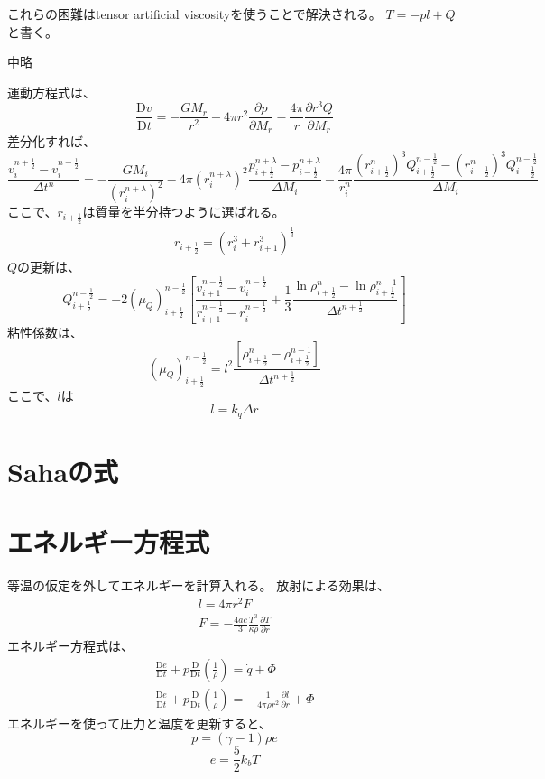\documentclass{jsarticle}
\newcommand{\pder}[2][]{\frac{\partial#1}{\partial#2}}
\newcommand{\Dder}[2][]{\frac{\mathrm{D}#1}{\mathrm{D}#2}}
\newcommand{\half}{\frac{1}{2}}
\newcommand{\hpn}{n + \half}
\newcommand{\hmn}{n - \half}
\newcommand{\hpi}{i + \half}
\newcommand{\beq}{\begin{equation}}
\newcommand{\eeq}{\end{equation}}
\begin{document}
これらの困難はtensor artificial viscosityを使うことで解決される。
$T = - pl + Q$と書く。　

中略

運動方程式は、
\beq
    \Dder[v]{t} = - \frac{GM_r}{r^2} - 4\pi r^2\pder[p]{M_r} - \frac{4\pi}{r}\pder[r^3Q]{M_r}
\eeq
差分化すれば、
\beq
    \frac{v^{n+\half}_i - v^{n-\half}_i}{\Delta t^n} =
    -\frac{GM_i}{(r^{n+\lambda}_i)^2}
    -4\pi(r^{n+\lambda}_i)^2
    \frac{p^{n+\lambda}_{i+\half} - p^{n+\lambda}_{i-\half}}{\Delta M_i}
    -\frac{4\pi}{r^{n}_i}
    \frac{(r^{n}_{i+\half})^3Q^{n-\half}_{i+\half} - (r^{n}_{i-\half})^3Q^{n-\half}_{i-\half}}{\Delta M_i}
\eeq
ここで、$r_{i+\half}$は質量を半分持つように選ばれる。
\begin{align}
    r_{i+\half} = (r^3_i + r^3_{i+1})^{\frac{1}{3}}
\end{align}
$Q$の更新は、
\beq
    Q^{\hmn}_{\hpi} = - 2 (\mu_Q)^{\hmn}_{\hpi}
     \left[\frac{v^{\hmn}_{i+1}-v^{\hmn}_{i}}{r^{\hmn}_{i+1}-r^{\hmn}_{i}}
      +\frac{1}{3}\frac{\ln \rho^{n}_{\hpi} - \ln \rho^{n-1}_{\hpi}}{\Delta t^{\hpn}}\right]
\eeq
粘性係数は、
\beq
    (\mu_Q)^{n-\half}_{i+\half} = 
    l^2 \frac{\left[ \rho^n_{\hpi} - \rho^{n-1}_{\hpi}\right]}{\Delta t^{\hpn}}
\eeq
ここで、$l$は
\beq
    l = k_q \Delta r
\eeq
\section{Sahaの式}

\section{エネルギー方程式}
等温の仮定を外してエネルギーを計算入れる。
放射による効果は、
\begin{align}
    l = 4\pi r^2 F\\
    F = - \frac{4ac}{3} \frac{T^3}{\kappa \rho}\pder[T]{r}
\end{align}
エネルギー方程式は、
\begin{align}
    \Dder[e]{t} + p \Dder[]{t}(\frac{1}{\rho}) = \dot{q} + \Phi\\
    \Dder[e]{t} + p \Dder[]{t}(\frac{1}{\rho}) = - \frac{1}{4\pi\rho r^2}\pder[l]{r} + \Phi
\end{align}    
エネルギーを使って圧力と温度を更新すると、
\begin{equation}
    p = (\gamma - 1) \rho e
\end{equation}
\begin{equation}
    e = \frac{5}{2}k_bT
\end{equation}


\end{document}
